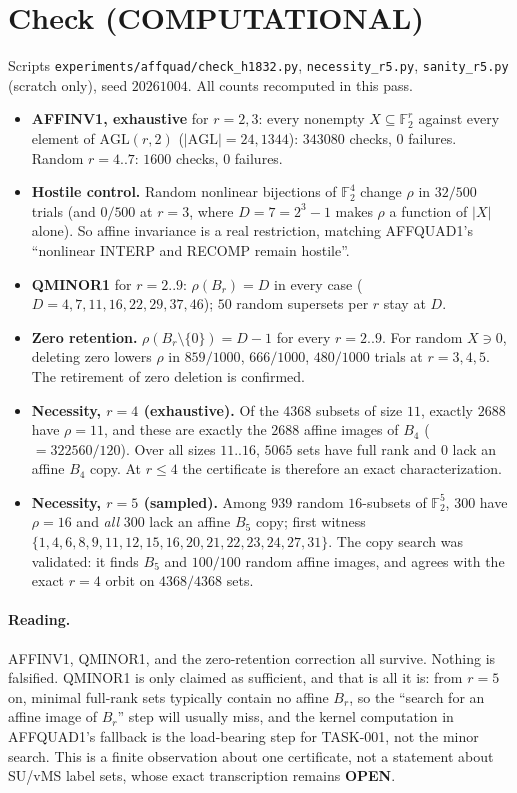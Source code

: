 \documentclass[11pt]{article}
\begin{document}
\section*{Check (COMPUTATIONAL)}
Scripts \texttt{experiments/affquad/check\_h1832.py}, \texttt{necessity\_r5.py}, \texttt{sanity\_r5.py} (scratch only), seed $20261004$. All counts recomputed in this pass.
\begin{itemize}
\item \textbf{AFFINV1, exhaustive} for $r=2,3$: every nonempty $X\subseteq\mathbb F_2^r$ against every element of $\mathrm{AGL}(r,2)$ ($|\mathrm{AGL}|=24,1344$): $343080$ checks, $0$ failures. Random $r=4..7$: $1600$ checks, $0$ failures.
\item \textbf{Hostile control.} Random nonlinear bijections of $\mathbb F_2^4$ change $\rho$ in $32/500$ trials (and $0/500$ at $r=3$, where $D=7=2^3-1$ makes $\rho$ a function of $|X|$ alone). So affine invariance is a real restriction, matching AFFQUAD1's ``nonlinear INTERP and RECOMP remain hostile''.
\item \textbf{QMINOR1} for $r=2..9$: $\rho(B_r)=D$ in every case ($D=4,7,11,16,22,29,37,46$); $50$ random supersets per $r$ stay at $D$.
\item \textbf{Zero retention.} $\rho(B_r\setminus\{0\})=D-1$ for every $r=2..9$. For random $X\ni0$, deleting zero lowers $\rho$ in $859/1000$, $666/1000$, $480/1000$ trials at $r=3,4,5$. The retirement of zero deletion is confirmed.
\item \textbf{Necessity, $r=4$ (exhaustive).} Of the $4368$ subsets of size $11$, exactly $2688$ have $\rho=11$, and these are exactly the $2688$ affine images of $B_4$ ($=322560/120$). Over all sizes $11..16$, $5065$ sets have full rank and $0$ lack an affine $B_4$ copy. At $r\le4$ the certificate is therefore an exact characterization.
\item \textbf{Necessity, $r=5$ (sampled).} Among $939$ random $16$-subsets of $\mathbb F_2^5$, $300$ have $\rho=16$ and \emph{all} $300$ lack an affine $B_5$ copy; first witness $\{1,4,6,8,9,11,12,15,16,20,21,22,23,24,27,31\}$. The copy search was validated: it finds $B_5$ and $100/100$ random affine images, and agrees with the exact $r=4$ orbit on $4368/4368$ sets.
\end{itemize}

\paragraph{Reading.} AFFINV1, QMINOR1, and the zero-retention correction all survive. Nothing is falsified. QMINOR1 is only claimed as sufficient, and that is all it is: from $r=5$ on, minimal full-rank sets typically contain no affine $B_r$, so the ``search for an affine image of $B_r$'' step will usually miss, and the kernel computation in AFFQUAD1's fallback is the load-bearing step for TASK-001, not the minor search. This is a finite observation about one certificate, not a statement about SU/vMS label sets, whose exact transcription remains \textbf{OPEN}.
\end{document}
